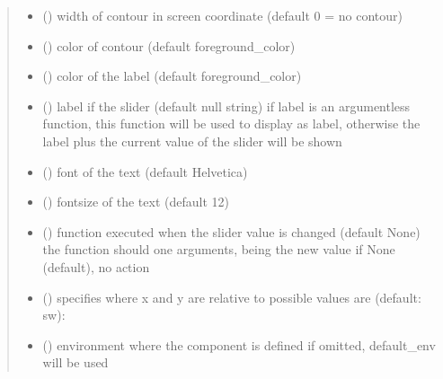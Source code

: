 \documentclass[letterpaper,10pt,english]{sphinxmanual}
\begin{document}
\begin{fulllineitems}
\begin{quote}
\begin{description}
\begin{itemize}
\item {} 
 () \textendash{} width of contour in screen coordinate (default 0 = no contour)

\item {} 
 () \textendash{} color of contour (default foreground\_color)

\item {} 
 () \textendash{} color of the label (default foreground\_color)

\item {} 
 () \textendash{} label if the slider (default null string) 
if label is an argumentless function, this function
will be used to display as label, otherwise the
label plus the current value of the slider will be shown

\item {} 
 () \textendash{} font of the text (default Helvetica)

\item {} 
 () \textendash{} fontsize of the text (default 12)

\item {} 
 () \textendash{} function executed when the slider value is changed (default None) 
the function should one arguments, being the new value 
if None (default), no action

\item {} 
 () \textendash{} specifies where x and y are relative to 
possible values are (default: sw): 

\item {} 
 ({\hyperref[\detokenize{Reference:salabim.Environment}]{}}) \textendash{} environment where the component is defined 
if omitted, default\_env will be used

\end{itemize}

\end{description}\end{quote}


\end{fulllineitems}
\end{document}
